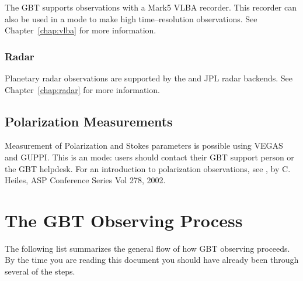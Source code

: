 %

\subsubsection{}

The \gls{GBT} supports  observations with a Mark5 \gls{VLBA}
recorder. This recorder can also be used in a  mode to make
high time--resolution observations.  See Chapter~\ref{chap:vlba} for more
information.

\subsubsection{Radar}
Planetary radar observations are supported by the  and
JPL radar backends.  See Chapter~\ref{chap:radar} for more information.

\subsection{Polarization Measurements}

Measurement of Polarization and Stokes parameters is possible using
\gls{VEGAS} and \gls{GUPPI}.  This is an  mode: users should
contact their GBT support person or the GBT helpdesk.  For an introduction to
polarization observations, see , by C. Heiles, ASP Conference Series
Vol 278, 2002.

\newpage

\section{The GBT Observing Process}

The following list summarizes the general flow of how \gls{GBT} observing
proceeds. By the time you are reading this document you should have already
been through several of the steps.


